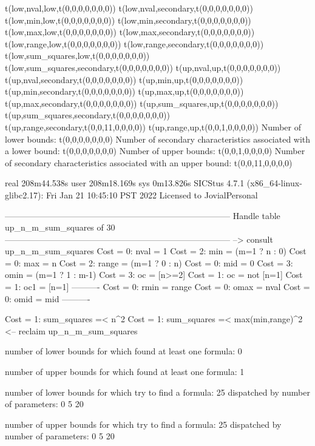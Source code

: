 t(low,nval,low,t(0,0,0,0,0,0,0))
t(low,nval,secondary,t(0,0,0,0,0,0,0))
t(low,min,low,t(0,0,0,0,0,0,0))
t(low,min,secondary,t(0,0,0,0,0,0,0))
t(low,max,low,t(0,0,0,0,0,0,0))
t(low,max,secondary,t(0,0,0,0,0,0,0))
t(low,range,low,t(0,0,0,0,0,0,0))
t(low,range,secondary,t(0,0,0,0,0,0,0))
t(low,sum_squares,low,t(0,0,0,0,0,0,0))
t(low,sum_squares,secondary,t(0,0,0,0,0,0,0))
t(up,nval,up,t(0,0,0,0,0,0,0))
t(up,nval,secondary,t(0,0,0,0,0,0,0))
t(up,min,up,t(0,0,0,0,0,0,0))
t(up,min,secondary,t(0,0,0,0,0,0,0))
t(up,max,up,t(0,0,0,0,0,0,0))
t(up,max,secondary,t(0,0,0,0,0,0,0))
t(up,sum_squares,up,t(0,0,0,0,0,0,0))
t(up,sum_squares,secondary,t(0,0,0,0,0,0,0))
t(up,range,secondary,t(0,0,11,0,0,0,0))
t(up,range,up,t(0,0,1,0,0,0,0))
Number of lower bounds:                                             t(0,0,0,0,0,0,0)
Number of secondary characteristics associated with a lower bound:  t(0,0,0,0,0,0,0)
Number of upper bounds:                                             t(0,0,1,0,0,0,0)
Number of secondary characteristics associated with an upper bound: t(0,0,11,0,0,0,0)

real	208m44.538s
user	208m18.169s
sys	0m13.826s
SICStus 4.7.1 (x86_64-linux-glibc2.17): Fri Jan 21 10:45:10 PST 2022
Licensed to JovialPersonal


--------------------------------------------------------------------------------
Handle table up_n_m_sum_squares of 30
--------------------------------------------------------------------------------
--> consult up_n_m_sum_squares
Cost =  0:  nval  = 1
Cost =  2:  min   = (m=1 ? n : 0)
Cost =  0:  max   = n
Cost =  2:  range = (m=1 ? 0 : n)
Cost =  0:  mid   = 0
Cost =  3:  omin  = (m=1 ? 1 : m-1)
Cost =  3:  oc    = [n>=2]
Cost =  1:  oc    = not [n=1]
Cost =  1:  oc1   = [n=1]
----------
Cost =  0:  rmin  = range
Cost =  0:  omax  = nval
Cost =  0:  omid  = mid
----------

Cost =  1:  sum_squares =< n^2
Cost =  1:  sum_squares =< max(min,range)^2
<-- reclaim up_n_m_sum_squares

number of lower bounds for which found at least one formula: 0

number of upper bounds for which found at least one formula: 1

number of lower bounds for which try to find a formula: 25
dispatched by number of parameters: 0  5  20

number of upper bounds for which try to find a formula: 25
dispatched by number of parameters: 0  5  20

